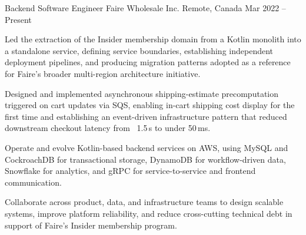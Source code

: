 
\begin{cventries}


  \cventry
    {Backend Software Engineer}
    {Faire Wholesale Inc.}
    {Remote, Canada}
    {Mar 2022 -- Present}
    {
      \begin{cvitems}
        \item {Led the extraction of the Insider membership domain from a Kotlin monolith into a standalone service, defining service boundaries, establishing independent deployment pipelines, and producing migration patterns adopted as a reference for Faire's broader multi-region architecture initiative.}
        \item {Designed and implemented asynchronous shipping-estimate precomputation triggered on cart updates via SQS, enabling in-cart shipping cost display for the first time and establishing an event-driven infrastructure pattern that reduced downstream checkout latency from ~1.5\,s to under 50\,ms.}
        \item {Operate and evolve Kotlin-based backend services on AWS, using MySQL and CockroachDB for transactional storage, DynamoDB for workflow-driven data, Snowflake for analytics, and gRPC for service-to-service and frontend communication.}
        \item {Collaborate across product, data, and infrastructure teams to design scalable systems, improve platform reliability, and reduce cross-cutting technical debt in support of Faire's Insider membership program.}
      \end{cvitems}
    }

\end{cventries}
